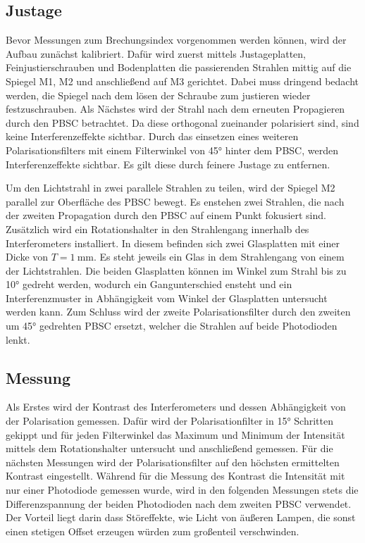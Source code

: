 \subsection{Justage}

Bevor Messungen zum Brechungsindex vorgenommen werden können, wird der Aufbau zunächst kalibriert. 
Dafür wird zuerst mittels Justageplatten, Feinjustierschrauben und Bodenplatten die passierenden Strahlen mittig auf die Spiegel M1, M2 und anschließend auf M3 gerichtet.
Dabei muss dringend bedacht werden, die Spiegel nach dem lösen der Schraube zum justieren wieder festzuschrauben.
Als Nächstes wird der Strahl nach dem erneuten Propagieren durch den PBSC betrachtet.
Da diese orthogonal zueinander polarisiert sind, sind keine Interferenzeffekte sichtbar.
Durch das einsetzen eines weiteren Polarisationsfilters mit einem Filterwinkel von 45° 
hinter dem PBSC, werden Interferenzeffekte sichtbar. Es gilt diese durch feinere Justage zu entfernen.

Um den Lichtstrahl in zwei parallele Strahlen zu teilen, wird der Spiegel M2 parallel zur
Oberfläche des PBSC bewegt. Es enstehen zwei Strahlen, die nach der zweiten
Propagation durch den PBSC auf einem Punkt fokusiert sind. 
Zus\"atzlich wird ein Rotationshalter in den Strahlengang innerhalb des Interferometers installiert. In diesem befinden sich zwei Glasplatten mit einer Dicke von $T=\SI{1}{\milli\metre}$.
Es steht jeweils ein Glas in dem Strahlengang von einem der Lichtstrahlen. Die beiden Glasplatten k\"onnen im Winkel zum Strahl bis zu 10° gedreht werden, wodurch ein Gangunterschied ensteht und
ein Interferenzmuster in Abh\"angigkeit vom Winkel der Glasplatten untersucht werden kann. 
Zum Schluss wird der zweite Polarisationsfilter
durch den zweiten um 45° gedrehten PBSC ersetzt, welcher die Strahlen auf beide Photodioden lenkt.

\subsection{Messung}

Als Erstes wird der Kontrast des Interferometers und dessen Abh\"angigkeit von der Polarisation gemessen. Daf\"ur wird
der Polarisationfilter in 15° Schritten gekippt und f\"ur jeden Filterwinkel das Maximum und Minimum der Intensit\"at mittels dem Rotationshalter untersucht und anschließend gemessen.
F\"ur die n\"achsten Messungen wird der Polarisationsfilter auf den h\"ochsten ermittelten Kontrast eingestellt.
W\"ahrend f\"ur die Messung des Kontrast die Intensität mit nur einer Photodiode gemessen wurde, wird in den folgenden Messungen stets die Differenzspannung der beiden Photodioden nach dem zweiten PBSC
verwendet. Der Vorteil liegt darin dass St\"oreffekte, wie Licht von \"au\ss{}eren Lampen, die sonst einen stetigen Offset erzeugen w\"urden zum gro\ss{}enteil verschwinden.

